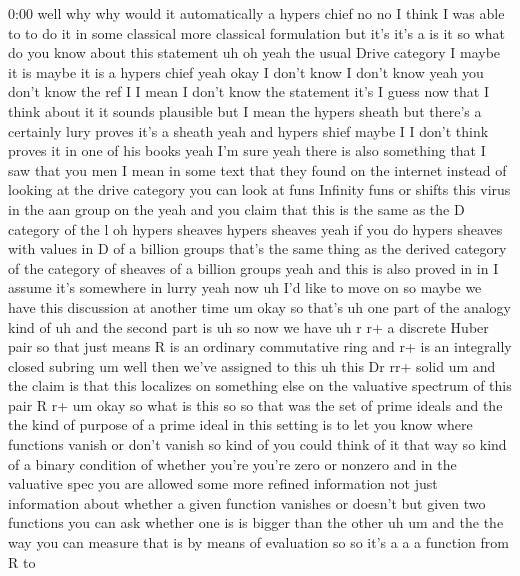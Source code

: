 \begin{unfinished}{0:00}
well  why  why  would  it  automatically  a
hypers
chief  no  no  I  think  I  was  able  to  to  do
it  in  some  classical  more  classical
formulation  but  it's  it's
a  is  it  so  what  do  you  know  about  this
statement  uh  oh  yeah  the  usual  Drive
category  I  maybe  it  is  maybe  it  is  a
hypers  chief  yeah  okay  I  don't  know  I
don't  know  yeah  you  don't  know  the  ref  I
I  mean  I  don't  know  the  statement  it's  I
guess  now  that  I  think  about  it  it
sounds  plausible  but  I  mean  the  hypers
sheath  but  there's  a  certainly  lury
proves  it's  a  sheath  yeah  and  hypers
shief  maybe  I  I  don't  think  proves  it  in
one  of  his  books  yeah  I'm  sure  yeah
there  is  also  something  that  I  saw  that
you  men  I  mean  in  some  text  that  they
found  on  the  internet  instead  of  looking
at  the  drive  category  you  can  look  at
funs  Infinity  funs  or  shifts  this  virus
in  the  aan  group  on  the  yeah  and  you
claim  that  this  is  the  same  as  the  D
category  of  the  l  oh  hypers  sheaves
hypers  sheaves  yeah  if  you  do  hypers
sheaves  with  values  in  D  of  a  billion
groups  that's  the  same  thing  as  the
derived  category  of  the  category  of
sheaves  of  a  billion  groups
yeah  and  this  is  also  proved  in  in  I
assume  it's  somewhere  in  lurry  yeah  now
uh  I'd  like  to  move  on  so  maybe  we  have
this  discussion  at  another
time  um  okay  so  that's  uh  one  part  of
the  analogy  kind  of
uh
and  the  second  part  is  uh  so  now  we  have
uh  r
r+  a  discrete  Huber
pair  so  that  just  means  R  is  an  ordinary
commutative
ring  and  r+  is  an  integrally  closed
subring
um  well  then  we've  assigned  to  this  uh
this  Dr
rr+
solid  um  and  the  claim  is  that  this
localizes  on  something
else  on  the  valuative  spectrum  of  this
pair  R
r+  um
okay  so  what  is  this
so
so  that  was  the  set  of  prime  ideals  and
the  the  kind  of  purpose  of  a  prime  ideal
in  this  setting  is  to  let  you  know  where
functions  vanish  or  don't  vanish  so  kind
of  you  could  think  of  it  that  way  so
kind  of  a  binary  condition  of
whether  you're  you're  zero  or  nonzero
and  in  the  valuative  spec
you  are  allowed  some  more  refined
information  not  just  information  about
whether  a  given  function  vanishes  or
doesn't  but  given  two  functions  you  can
ask  whether  one  is  is  bigger  than  the
other  uh  um  and  the  the  way  you  can
measure  that  is  by  means  of  evaluation
so  so  it's  a  a  a  function  from  R  to

\end{unfinished}
